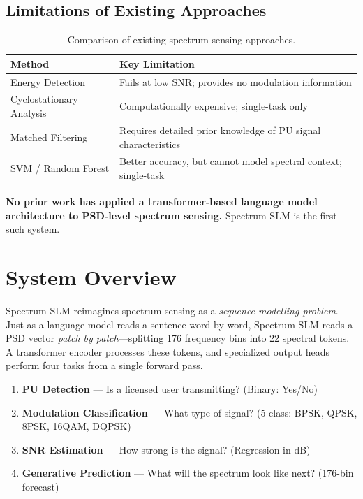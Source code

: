\documentclass[12pt,a4paper]{article}
\begin{document}
\subsection{Limitations of Existing Approaches}
\begin{table}[H]\centering
\begin{tabular}{@{}p{3.8cm}p{9cm}@{}}
\toprule \textbf{Method} & \textbf{Key Limitation} \\\midrule
Energy Detection & Fails at low SNR; provides no modulation information \\
Cyclostationary Analysis & Computationally expensive; single-task only \\
Matched Filtering & Requires detailed prior knowledge of PU signal characteristics \\
SVM / Random Forest & Better accuracy, but cannot model spectral context; single-task \\
\bottomrule
\end{tabular}
\caption{Comparison of existing spectrum sensing approaches.}
\end{table}

\noindent\textbf{No prior work has applied a transformer-based language model architecture to PSD-level spectrum sensing.} Spectrum-SLM is the first such system.

\section{System Overview}

Spectrum-SLM reimagines spectrum sensing as a \textit{sequence modelling problem}. Just as a language model reads a sentence word by word, Spectrum-SLM reads a PSD vector \textit{patch by patch}---splitting 176 frequency bins into 22 spectral tokens. A transformer encoder processes these tokens, and specialized output heads perform four tasks from a single forward pass.

\begin{keybox}
\begin{enumerate}[leftmargin=1.5em]
\item \textbf{PU Detection} --- Is a licensed user transmitting? (Binary: Yes/No)
\item \textbf{Modulation Classification} --- What type of signal? (5-class: BPSK, QPSK, 8PSK, 16QAM, DQPSK)
\item \textbf{SNR Estimation} --- How strong is the signal? (Regression in dB)
\item \textbf{Generative Prediction} --- What will the spectrum look like next? (176-bin forecast)
\end{enumerate}
\end{keybox}
\end{document}
